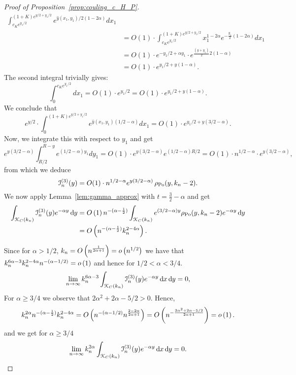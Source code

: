 \begin{proof}[Proof of Proposition~\ref{prop:couling_c_H_P}]
\begin{align*}
\int_{c_K e^{y_1/2}}^{(1+K)e^{y/2 + y_1/2}} e^{\hat{y}(x_1,y_1)/2 (1 -2\alpha)} dx_1  \\
&= O(1)\cdot \int_{c_K e^{y_1/2}}^{(1+K)e^{y/2 + y_1/2}} x_1^{1 -2\alpha} 
e^{-\frac{y_1}{2} (1-2\alpha)} dx_1 \\
&= O(1) \cdot e^{-y_1/2 + \alpha y_1} \cdot e^{\frac{(y+y_1)}{2} 2(1-\alpha)} \\
&=O(1) \cdot e^{y_1/2 +y(1-\alpha)}.  
\end{align*}
The second integral trivially gives: 
\[
	\int_0^{c_K e^{y_1/2}} dx_1 = O(1) \cdot e^{y_1/2} = O(1) \cdot e^{y_1/2 +y(1-\alpha)}.
\]
We conclude that 
\[
	e^{y/2} \cdot \int_0^{(1+K)e^{y/2 + y_1/2}} e^{\hat{y}(x_1,y_1) (1/2 -\alpha)} dx_1 = 
	O(1) \cdot e^{y_1/2 +y(3/2-\alpha)}.
\]
Now, we integrate this with respect to $y_1$ and get 
\[
	e^{y(3/2 -\alpha)} \int_{R/2}^{R-y} e^{(1/2-\alpha)y_1} dy_1 =  O(1) \cdot e^{y(3/2 -\alpha)} 
	e^{(1/2 -\alpha) R/2} = O(1) \cdot n^{1/2 -\alpha} \cdot e^{y(3/2 - \alpha)},
\]
from which we deduce
\begin{equation} \label{eq:term3_intermediate}
	\mathcal{I}_n^{(3)}(y) = 
	O(1) \cdot n^{1/2 -\alpha} e^{y(3/2 - \alpha)} \, \rho_{{\mathrm{Po}}}(y,k_n-2). 
\end{equation}
We now apply Lemma~\ref{lem:gamma_approx} with $t = \frac{3}{2} - \alpha$ and get 
\begin{align*}
	\int_{{\mathcal K}_{C}(k_n)} \mathcal{I}_n^{(3)}(y) e^{-\alpha y} \operatorname{\mathrm{d}\hspace{-2pt}} y
	&= O\left(1\right) n^{-(\alpha - \frac{1}{2})} \int_{{\mathcal K}_{C}(k_n)} e^{(3/2 - \alpha)y} \rho_{{\mathrm{Po}}}(y,k_n-2) e^{-\alpha y} 
		\operatorname{\mathrm{d}\hspace{-2pt}} y\\
	&= O\left(n^{-(\alpha - \frac{1}{2})} k_n^{2 -4\alpha}\right).
\end{align*}

Since for $\alpha > 1/2$, $k_n = O\left(n^{\frac{1}{2\alpha +1}}\right) = o\left(n^{1/2}\right)$ we have that $k_n^{6\alpha - 3} k_n^{2 - 4\alpha} n^{-(\alpha - 1/2)} = o\left(1\right)$ and hence for $1/2 < \alpha < 3/4$.
\[
	\lim_{n \to \infty} k_n^{6\alpha - 3} \int_{{\mathcal K}_{C}(k_n)} \mathcal{I}_n^{(3)}(y) e^{-\alpha y} \operatorname{\mathrm{d}\hspace{-2pt}} x \operatorname{\mathrm{d}\hspace{-2pt}} y = 0,
\]
For $\alpha \ge 3/4$ we observe that $2\alpha^2 + 2\alpha - 5/2 > 0$. Hence,
\[
	k_n^{2\alpha} n^{-(\alpha - \frac{1}{2})} k_n^{2 -4\alpha} 
	= O\left(n^{-(\alpha - 1/2)} n^{\frac{2 - 2\alpha}{2\alpha + 1}}\right)
 	= O\left(n^{- \frac{2\alpha^2 + 2\alpha - 5/2}{2\alpha + 1}}\right) = o\left(1\right).
\]
and we get for $\alpha \ge 3/4$
\[
	\lim_{n \to \infty} k_n^{2\alpha} \int_{{\mathcal K}_{C}(k_n)} \mathcal{I}_n^{(3)}(y) e^{-\alpha y} \operatorname{\mathrm{d}\hspace{-2pt}} x \operatorname{\mathrm{d}\hspace{-2pt}} y = 0.
\]




\end{proof}
